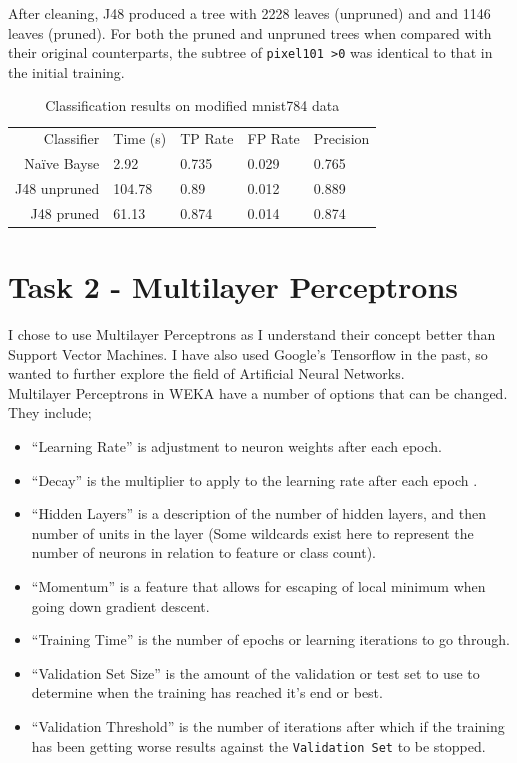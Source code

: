 \documentclass[10pt]{article}
\begin{document}
      After cleaning, J48 produced a tree with 2228 leaves (unpruned) and and 1146 leaves (pruned). For both the pruned and unpruned trees when compared with their original counterparts, the subtree of \texttt{pixel101 \textgreater 0} was identical to that in the initial training. 

      \begin{table}
        \centering
        \begin{tabular}{ | r | l | l | l | l |}
          \hline
          Classifier   & Time (s)  & TP Rate & FP Rate & Precision \\ \hhline{|=|=|=|=|=|}
          Naïve Bayse  & 2.92      & 0.735   & 0.029   & 0.765     \\ \hline
          J48 unpruned & 104.78    & 0.89    & 0.012   & 0.889     \\ \hline
          J48 pruned   & 61.13     & 0.874   & 0.014   & 0.874     \\ \hline
        \end{tabular}
        \caption{Classification results on modified mnist784 data}
        \label{table:task1RetrainResults}
      \end{table}

  \section{Task 2 - Multilayer Perceptrons}
    \label{sec:2}

    I chose to use Multilayer Perceptrons as I understand their concept better than Support Vector Machines. I have also used Google's Tensorflow in the past, so wanted to further explore the field of Artificial Neural Networks.\\

    Multilayer Perceptrons in WEKA have a number of options that can be changed. They include;

    \begin{itemize}
      \item ``Learning Rate'' is adjustment to neuron weights after each epoch.
      \item ``Decay'' is the multiplier to apply to the learning rate after each epoch \cite{wekaGitMirrorDecay}.
      \item ``Hidden Layers'' is a description of the number of hidden layers, and then number of units in the layer (Some wildcards exist here to represent the number of neurons in relation to feature or class count).
      \item ``Momentum'' is a feature that allows for escaping of local minimum when going down gradient descent.
      \item ``Training Time'' is the number of epochs or learning iterations to go through.
      \item ``Validation Set Size'' is the amount of the validation or test set to use to determine when the training has reached it's end or best.
      \item ``Validation Threshold'' is the number of iterations after which if the training has been getting worse results against the \texttt{Validation Set} to be stopped.
    \end{itemize}
    
\end{document}
